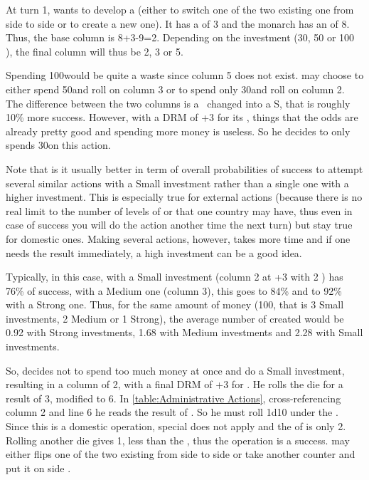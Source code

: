 \begin{exemple}
  At turn 1, \POR wants to develop a \MNU (either to switch one of the two
  existing one from side \Facemoins to side \Faceplus or to create a new
  one). It has a \DTI of 3 and the monarch has an \ADM of 8. Thus, the base
  column is 8+3-9=2. Depending on the investment (30, 50 or 100 \ducats), the
  final column will thus be 2, 3 or 5.

  Spending 100\ducats would be quite a waste since column 5 does not
  exist. \POR may choose to either spend 50\ducats and roll on column 3 or to
  spend only 30\ducats and roll on column 2. The difference between the two
  columns is a \undemi\ changed into a S, that is roughly 10\% more
  success. However, with a DRM of +3 for its \STAB, \POR things that the odds
  are already pretty good and spending more money is useless. So he decides to
  only spends 30\ducats on this action.
\end{exemple}

\begin{designnote}
  Note that is it usually better in term of overall probabilities of success
  to attempt several similar actions with a Small investment rather than a
  single one with a higher investment. This is especially true for external
  actions (because there is no real limit to the number of levels of
  \TradeFLEET or \COL that one country may have, thus even in case of success
  you will do the action another time the next turn) but stay true for
  domestic ones. Making several actions, however, takes more time and if one
  needs the result immediately, a high investment can be a good idea.

  Typically, in this case, with a Small investment (column 2 at +3 with 2
  \FTI) \POR has 76\% of success, with a Medium one (column 3), this goes to
  84\% and to 92\% with a Strong one. Thus, for the same amount of money
  (100\ducats, that is 3 Small investments, 2 Medium or 1 Strong), the average
  number of \MNU created would be 0.92 with Strong investments, 1.68 with
  Medium investments and 2.28 with Small investments.
\end{designnote}

\begin{exemple}[continued]
  So, \POR decides not to spend too much money at once and do a Small
  investment, resulting in a column of 2, with a final DRM of +3 for \STAB. He
  rolls the die for a result of 3, modified to 6. In \ref{table:Administrative
    Actions}, cross-referencing column 2 and line 6 he reads the result of
  \undemi. So he must roll 1d10 under the \FTI. Since this is a domestic
  operation, special \FTI does not apply and the \FTI of \POR is only
  2. Rolling another die gives 1, less than the \FTI, thus the operation is a
  success. \POR may either flips one of the two existing \MNU from side
  \Facemoins to side \Faceplus or take another \MNU counter and put it on side
  \Facemoins.
\end{exemple}

